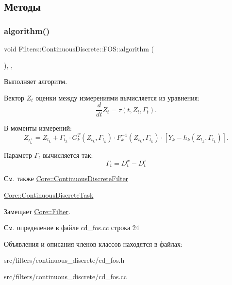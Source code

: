 \subsection{Методы}
\hypertarget{class_filters_1_1_continuous_discrete_1_1_f_o_s_a1e3d6f40678f13a33971bc7bceb45496}{}\label{class_filters_1_1_continuous_discrete_1_1_f_o_s_a1e3d6f40678f13a33971bc7bceb45496} 
\subsubsection{\texorpdfstring{algorithm()}{algorithm()}}
{\footnotesize\ttfamily void Filters\+::\+Continuous\+Discrete\+::\+F\+O\+S\+::algorithm (\begin{DoxyParamCaption}{ }\end{DoxyParamCaption})\hspace{0.3cm}{\ttfamily [override]}, {\ttfamily [protected]}, {\ttfamily [virtual]}}



Выполняет алгоритм. 

Вектор $Z_t$ оценки между измерениями вычисляется из уравнения\+: \[\frac{d}{dt}Z_t = \tau(t,Z_t, \Gamma_t).\]

В моменты измерений\+: \[Z_{t_k^+} = Z_{t_k} + \Gamma_{t_k} \cdot G_k^T(Z_{t_k}, \Gamma_{t_k}) \cdot F_k^{-1}(Z_{t_k}, \Gamma_{t_k}) \cdot [Y_k - h_k(Z_{t_k}, \Gamma_{t_k})].\]

Параметр $\Gamma_t$ вычисляется так\+: \[\Gamma_t = D_t^x - D_t^z\]

\begin{DoxySeeAlso}{См. также}
\hyperlink{class_core_1_1_continuous_discrete_filter}{Core\+::\+Continuous\+Discrete\+Filter} 

\hyperlink{class_core_1_1_continuous_discrete_task}{Core\+::\+Continuous\+Discrete\+Task} 
\end{DoxySeeAlso}


Замещает \hyperlink{class_core_1_1_filter_a438681ee3e54aba2148042d9f8011ab8}{Core\+::\+Filter}.



См. определение в файле cd\+\_\+fos.\+cc строка 24



Объявления и описания членов классов находятся в файлах\+:\begin{DoxyCompactItemize}
\item 
src/filters/continuous\+\_\+discrete/cd\+\_\+fos.\+h\item 
src/filters/continuous\+\_\+discrete/cd\+\_\+fos.\+cc\end{DoxyCompactItemize}
